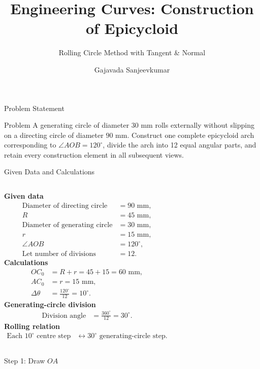 \documentclass[aspectratio=169,10pt]{beamer}
\title[Engineering Curves: Epicycloid]{Engineering Curves: Construction of Epicycloid}
\subtitle{Rolling Circle Method with Tangent \& Normal}
\author{Gajavada Sanjeevkumar}
\date{}
\newcommand{\Legend}[1]{\node[draw=gray!35,fill=white,rounded corners=2pt,inner sep=3pt,anchor=north east,align=left,font=\scriptsize,text width=31mm] at (84,84){#1};}
\newcommand{\OADim}{\draw[dimension line]($(O)+(240:6)$)--($(A)+(240:6)$)node[midway,sloped,above,fill=white,inner sep=1pt,font=\scriptsize]{$45\ \mathrm{mm}$};\draw[thin,black!55]($(O)+(240:1)$)--($(O)+(240:8)$);\draw[thin,black!55]($(A)+(240:1)$)--($(A)+(240:8)$);}
\begin{document}
\begin{frame}[plain]\titlepage\end{frame}
\begin{frame}{Problem Statement}
\begin{block}{Problem}
\vspace{0.35em}
A generating circle of diameter $30$ mm rolls externally without slipping on a directing circle of diameter $90$ mm. Construct one complete epicycloid arch corresponding to $\angle AOB=120^\circ$, divide the arch into 12 equal angular parts, and retain every construction element in all subsequent views.
\vspace{0.35em}
\end{block}
\end{frame}
\begin{frame}{Given Data and Calculations}
\begin{columns}[T,onlytextwidth]
\textbf{Given data}
\begin{align*}
\text{Diameter of directing circle} &=90\text{ mm},\\
R&=45\text{ mm},\\
\text{Diameter of generating circle} &=30\text{ mm},\\
r&=15\text{ mm},\\
\angle AOB&=120^\circ,\\
\text{Let number of divisions}&=12.
\end{align*}
\vspace{-0.4em}
\textbf{Calculations}
\begin{align*}
OC_0&=R+r=45+15=60\text{ mm},\\
AC_0&=r=15\text{ mm},\\
\Delta\theta&=\frac{120^\circ}{12}=10^\circ.
\end{align*}
\textbf{Generating-circle division}
\begin{align*}
\text{Division angle}&=\frac{360^\circ}{12}=30^\circ.
\end{align*}
\vspace{0.3em}
\textbf{Rolling relation}
\begin{align*}
\text{Each }10^\circ\text{ centre step}&\leftrightarrow 30^\circ\text{ generating-circle step}.
\end{align*}
\end{columns}
\end{frame}
\begin{frame}{Step 1: Draw $OA$}\centering{}\end{frame}
\end{document}

